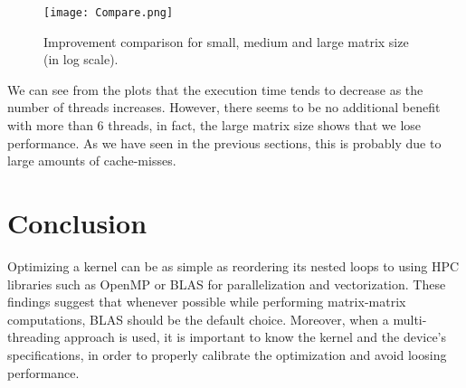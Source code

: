 \documentclass[a4paper, 10 pt, conference]{ieeeconf}
\begin{document}
\begin{figure}[H]
    \centering
    \texttt{[image: Compare.png]}
    \caption{Improvement comparison for small, medium and large matrix size (in log scale).}
\end{figure}
\noindent We can see from the plots that the execution time tends to decrease as the number of threads increases. However, there seems to be no additional benefit with more than 6 threads, in fact, the large matrix size shows that we lose performance. As we have seen in the previous sections, this is probably due to large amounts of cache-misses. 

\section{\textbf{Conclusion}}

Optimizing a kernel can be as simple as reordering its nested loops to using HPC libraries such as OpenMP or BLAS for parallelization and vectorization. These findings suggest that whenever possible while performing matrix-matrix computations, BLAS should be the default choice. Moreover, when a multi-threading approach is used, it is important to know the kernel and the device's specifications, in order to properly calibrate the optimization and avoid loosing performance. 



\printbibliography
\end{document}

